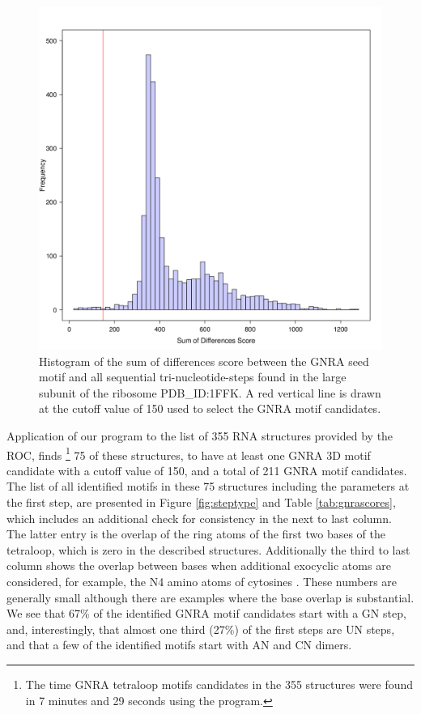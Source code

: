 \begin{figure}
\centering 
\includegraphics[angle=0, scale=0.5]{Chapter5/gnrahisto.png}
\caption{Histogram of  the sum of  differences score between  the GNRA
  seed  motif and  all  sequential tri-nucleotide-steps  found in  the
  large subunit of  the ribosome PDB\_ID:1FFK. A red  vertical line is
  drawn  at the  cutoff value  of 150  used to  select the  GNRA motif
  candidates.}
\label{fig:gnrahist}
\end{figure}

Application of our program to  the list of 355 RNA structures provided
by the ROC, finds  \footnote{The time GNRA tetraloop motifs candidates
  in the 355  structures were found in 7 minutes  and 29 seconds using
  the program.}  75 of these structures,  to have at least one GNRA 3D
motif candidate  with a cutoff value of  150, and a total  of 211 GNRA
motif  candidates.  The  list of  all  identified motifs  in these  75
structures including  the parameters at the first  step, are presented
in  Figure \ref{fig:steptype}  and  Table \ref{tab:gnrascores},  which
includes  an additional  check for  consistency  in the  next to  last
column.  The  latter entry  is the  overlap of the  ring atoms  of the
first  two bases  of the  tetraloop, which  is zero  in  the described
structures.  Additionally  the third to last column  shows the overlap
between  bases when  additional  exocyclic atoms  are considered,  for
example, the N4 amino atoms of cytosines \cite{lu2003}.  These numbers
are generally small although there are examples where the base overlap
is  substantial.  We  see  that  67\% of  the  identified  GNRA  motif
candidates start with  a GN step, and, interestingly,  that almost one
third (27\%) of  the first steps are  UN steps, and that a  few of the
identified motifs start with AN and CN dimers.

